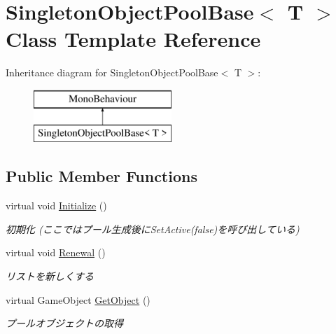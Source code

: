 \hypertarget{class_singleton_object_pool_base}{}\section{Singleton\+Object\+Pool\+Base$<$ T $>$ Class Template Reference}
\label{class_singleton_object_pool_base}


 


Inheritance diagram for Singleton\+Object\+Pool\+Base$<$ T $>$\+:\begin{figure}[H]
\begin{center}
\leavevmode
\includegraphics[height=2.000000cm]{class_singleton_object_pool_base}
\end{center}
\end{figure}
\subsection*{Public Member Functions}
\begin{DoxyCompactItemize}
\item 
virtual void \hyperlink{class_singleton_object_pool_base_ac7911635f1fff2562f4e0fe260f8addb}{Initialize} ()
\begin{DoxyCompactList}\small\item\em 初期化 (ここではプール生成後に\+Set\+Active(false)を呼び出している) \end{DoxyCompactList}\item 
virtual void \hyperlink{class_singleton_object_pool_base_a243b2d0a5b80b5b2e479dc2c5beeb079}{Renewal} ()
\begin{DoxyCompactList}\small\item\em リストを新しくする \end{DoxyCompactList}\item 
virtual Game\+Object \hyperlink{class_singleton_object_pool_base_a1957d69d05289232b43cb8e24a1bc648}{Get\+Object} ()
\begin{DoxyCompactList}\small\item\em プールオブジェクトの取得 \end{DoxyCompactList}\end{DoxyCompactItemize}
